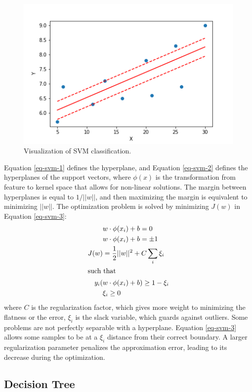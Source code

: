 \begin{figure}[htbp!] %
  \centering
  \includegraphics[width=0.5\linewidth]{figures/svr}
  \caption{Visualization of SVM classification.}
  \label{fig:svm}
\end{figure}

Equation \ref{eq-svm-1} defines the hyperplane, and Equation \ref{eq-svm-2} defines the hyperplanes of the support vectors, where $\phi(x)$ is the transformation from feature to kernel space that allows for non-linear solutions.
The margin between hyperplanes is equal to $1/||w||$, and then maximizing the margin is equivalent to minimizing $||w||$.
The optimization problem is solved by minimizing $J(w)$ in Equation \ref{eq-svm-3}:
\begin{align}
&w \cdot \phi(x_i) + b = 0    \label{eq-svm-1} \\
&w \cdot \phi(x_i) + b = \pm1 \label{eq-svm-2} \\
J(w) &= \frac{1}{2} ||w||^2 + C \sum_i \xi_i \label{eq-svm-3} \\
\intertext{such that}
y_i(&w \cdot \phi(x_i) + b) \geq 1-\xi_i \\
& \xi_i \geq 0
\end{align}
where $C$ is the regularization factor, which gives more weight to minimizing the flatness or the error, $\xi_i$ is the slack variable, which guards against outliers.
Some problems are not perfectly separable with a hyperplane.
Equation \ref{eq-svm-3} allows some samples to be at a $\xi_i$ distance from their correct boundary.
A larger regularization parameter penalizes the approximation error, leading to its decrease during the optimization.


\subsection{Decision Tree}

